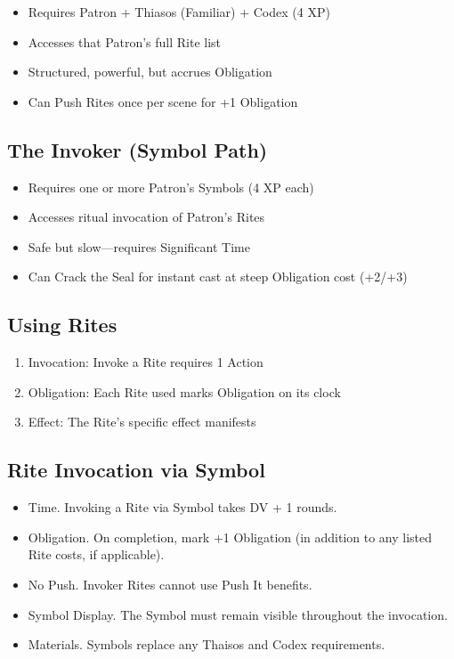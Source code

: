 \documentclass[11pt,twoside,openany]{book}
\begin{document}
\begin{itemize}
\item Requires Patron + Thiasos (Familiar) + Codex (4 XP)
\item Accesses that Patron's full Rite list
\item Structured, powerful, but accrues Obligation
\item Can Push Rites once per scene for +1 Obligation
\end{itemize}

\subsection*{The Invoker (Symbol Path)}

\begin{itemize}
\item Requires one or more Patron's Symbols (4 XP each)
\item Accesses ritual invocation of Patron's Rites
\item Safe but slow—requires Significant Time
\item Can Crack the Seal for instant cast at steep Obligation cost (+2/+3)
\end{itemize}

\subsection*{Using Rites}

\begin{enumerate}
\item Invocation: Invoke a Rite requires 1 Action
\item Obligation: Each Rite used marks Obligation on its clock
\item Effect: The Rite's specific effect manifests
\end{enumerate}

\subsection*{Rite Invocation via Symbol}

\begin{itemize}
\item Time. Invoking a Rite via Symbol takes DV + 1 rounds.
\item Obligation. On completion, mark +1 Obligation (in addition to any listed Rite costs, if applicable).
\item No Push. Invoker Rites cannot use Push It benefits.
\item Symbol Display. The Symbol must remain visible throughout the invocation.
\item Materials. Symbols replace any Thaisos and Codex requirements.
\end{itemize}
\end{document}
